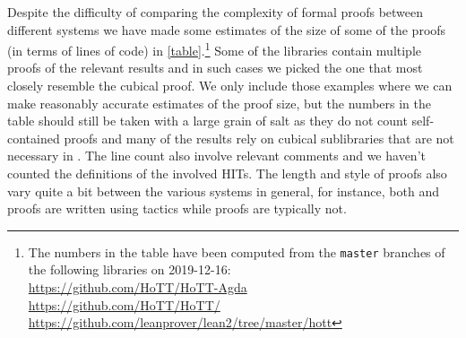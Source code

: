 Despite the difficulty of comparing the complexity of formal proofs
between different systems we have made some estimates of the size of
some of the proofs (in terms of lines of code) in
\cref{table}.\footnote{The numbers in the table have been computed
  from the \texttt{master} branches of the following libraries on
  2019-12-16:\\ \url{https://github.com/HoTT/HoTT-Agda}\\
  \url{https://github.com/HoTT/HoTT/}\\
  \url{https://github.com/leanprover/lean2/tree/master/hott}}
Some of the libraries contain multiple proofs of the relevant results
and in such cases we picked the one that most closely resemble the
cubical proof. We only include those examples where we can make
reasonably accurate estimates of the proof size, but the numbers in
the table should still be taken with a large grain of salt as they do
not count self-contained proofs and many of the results rely on
cubical sublibraries that are not necessary in \CubicalAgda. The line
count also involve relevant comments and we haven't counted the
definitions of the involved HITs. The length and style of proofs also
vary quite a bit between the various systems in general, for instance,
both \Coq and \Lean proofs are written using tactics while \Agda proofs
are typically not.

